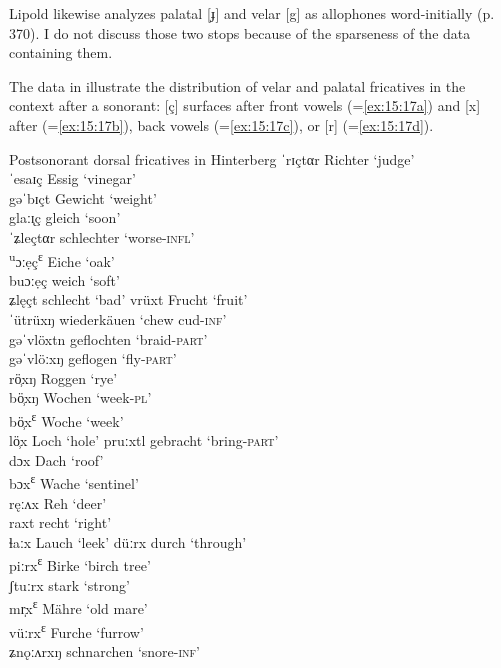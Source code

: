 {Lipold likewise analyzes palatal [ɟ] and velar [g] as allophones word-initially (p. 370). I do not discuss those two stops because of the sparseness of the data containing them.

The data in  illustrate the distribution of velar and palatal fricatives in the context after a sonorant: [ç] surfaces after front vowels (=\ref{ex:15:17a}) and [x] after  (=\ref{ex:15:17b}), back vowels (=\ref{ex:15:17c}), or [r] (=\ref{ex:15:17d}).

\ea%
\label{ex:15:17}Postsonorant dorsal fricatives in Hinterberg
\ea\label{ex:15:17a} ˈrɪçtαr \tab Richter \tab ‘judge’ \\
    ˈesaɪç \tab Essig \tab ‘vinegar’ \\
    gəˈbɪçt \tab Gewicht \tab ‘weight’ \\
    glaːɪ̨ç \tab gleich \tab ‘soon’ \\
    ˈʑleçtαr \tab schlechter \tab ‘worse-\textsc{infl}’ \\
    \textsuperscript{u}ɔːẹç\textsuperscript{ɛ} \tab Eiche \tab ‘oak’ \\
    buɔːẹç \tab weich \tab ‘soft’ \\
    ʑlęçt \tab schlecht \tab ‘bad’ 
\ex\label{ex:15:17b}  vrüxt \tab Frucht \tab ‘fruit’ \\
    ˈütrüxŋ \tab wiederkäuen \tab ‘chew cud-\textsc{inf}’ \\
    gəˈvlöxtn \tab geflochten \tab ‘braid-\textsc{part}’ \\
    gəˈvlöːxŋ \tab geflogen \tab ‘fly-\textsc{part}’ \\
    rö̹xŋ \tab Roggen \tab ‘rye’ \\
    bö̹xŋ \tab Wochen \tab ‘week-\textsc{pl}’ \\
    bö̹x\textsuperscript{ɛ} \tab Woche \tab ‘week’ \\
    lö̹x  \tab  Loch \tab ‘hole’ 
\ex\label{ex:15:17c} pruːxtl \tab gebracht \tab ‘bring-\textsc{part}’ \\
    dɔx  \tab  Dach \tab ‘roof’ \\
    bɔx\textsuperscript{ɛ} \tab Wache \tab ‘sentinel’ \\
    ręːʌx \tab Reh \tab ‘deer’ \\
    raxt  \tab  recht \tab ‘right’ \\
    ɬaːx  \tab  Lauch \tab ‘leek’ 
\ex\label{ex:15:17d} düːrx \tab durch \tab ‘through’ \\
    piːrx\textsuperscript{ɛ} \tab Birke \tab ‘birch tree’ \\
    ʃtuːrx \tab stark \tab ‘strong’ \\
    mr̩x\textsuperscript{ɛ} \tab Mähre \tab ‘old mare’ \\
    vüːrx\textsuperscript{ɛ} \tab Furche \tab ‘furrow’ \\
    ʑnǫːʌrxŋ \tab schnarchen \tab ‘snore-\textsc{inf}’ 
    \z
\z
    
}
